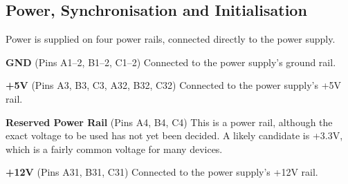
















\subsection{Power, Synchronisation and Initialisation}
\label{sec-bus-power-clock-reset}

Power is supplied on four power rails, connected directly to the power
supply.

\begin{description}
\item{\bfseries GND} (Pins A1–2, B1–2, C1–2) Connected
  to the power supply's ground rail.
\item{\bfseries +5V} (Pins A3, B3, C3, A32, B32, C32) Connected to the power supply's +5V rail.
\item{\bfseries Reserved Power Rail} (Pins A4, B4, C4) This is a power rail,
  although the exact voltage to be used has not yet been decided. A
  likely candidate is +3.3V, which is a fairly common voltage for many
  devices.
\item{\bfseries +12V} (Pins A31, B31, C31) Connected to the power supply's
  +12V rail.
\end{description}

